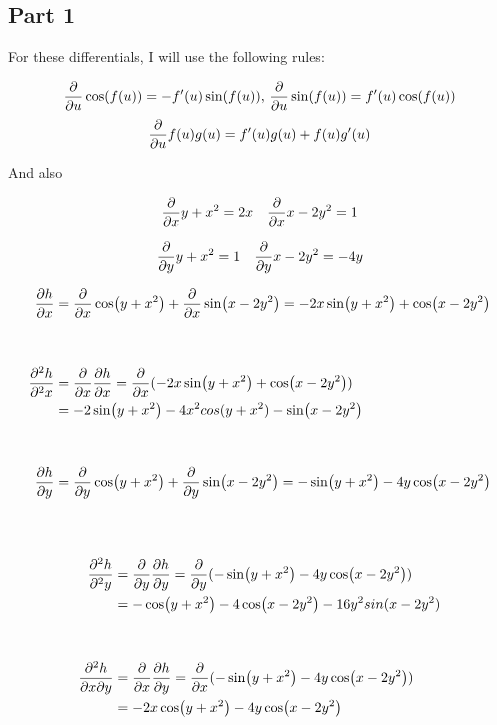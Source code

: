\documentclass[12pt]{article} %
\begin{document}
\pagebreak

\begin{homeworkProblem}
    \subsection*{Part 1}

    For these differentials, I will use the following rules:

    $$\frac{\partial}{\partial u} \cos(f(u)) = - f'(u) \sin(f(u)) \text{, } \frac{\partial}{\partial u} \sin(f(u)) = f'(u) \cos(f(u))$$
    $$\frac{\partial}{\partial u} f(u)g(u) = f'(u) g(u) + f(u) g'(u)$$

    And also

    $$
        \frac{\partial}{\partial x} y + x^2 = 2x \quad \frac{\partial}{\partial x} x - 2y^2 = 1
    $$

    $$
        \frac{\partial}{\partial y} y + x^2 = 1 \quad \frac{\partial}{\partial y} x - 2y^2 = -4y
    $$

    \begin{align*}
        \frac{\partial h}{\partial x}   & = \frac{\partial}{\partial x} \cos(y + x^2) + \frac{\partial}{\partial x} \sin(x - 2y^2) = - 2x \sin(y + x^2) + \cos(x - 2y^2) \\ \\ \\
        \frac{\partial^2h}{\partial^2x} & = \frac{\partial}{\partial x} \frac{\partial h}{\partial x} =\frac{\partial}{\partial x} (- 2x \sin(y + x^2) + \cos(x - 2y^2))                 \\
                        & = -2 \sin(y + x^2) -4x^2 cos(y + x^2) - \sin(x - 2y^2)                                           \\ \\ \\
        \frac{\partial h}{\partial y}   & = \frac{\partial}{\partial y} \cos(y + x^2) + \frac{\partial}{\partial y} \sin(x - 2y^2) = -\sin(y + x^2) - 4y \cos(x - 2y^2)  \\ \\ \\
    \end{align*}

    \begin{align*}
        \frac{\partial^2h}{\partial^2y}                           & = \frac{\partial}{\partial y} \frac{\partial h}{\partial y} =\frac{\partial}{\partial y} (-\sin(y + x^2) - 4y \cos(x - 2y^2))  \\
                                                  & = - \cos(y + x^2) - 4 \cos(x - 2y^2) - 16y^2 sin(x - 2y^2)                       \\ \\ \\
        \frac{\partial^2h}{\partial x \partial y} & = \frac{\partial}{\partial x} \frac{\partial h}{\partial y} = \frac{\partial}{\partial x} (-\sin(y + x^2) - 4y \cos(x - 2y^2)) \\
                                                  & =-2x \cos(y + x^2) - 4y  \cos(x -2y^2)
    \end{align*}
    \pagebreak


\end{homeworkProblem}
\end{document}
